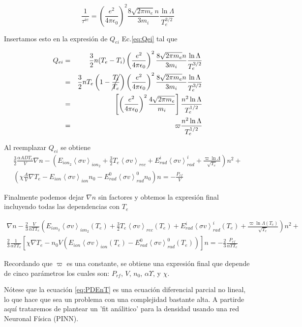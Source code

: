 \documentclass[11pt]{article}
\theoremstyle{definition}
\begin{document}
  \begin{equation*}
    \frac{1}{\tau^{ie}} = \left(\frac{e^2}{4\pi\epsilon_0}\right)^2\frac{8\sqrt{2\pi m_e}n}{3 m_i}\frac{\ln{\Lambda}}{T_e^{3/2}}
  \end{equation*} 

  Insertamos esto en la expresi\'on de $Q_{ei}$ Ec.\eqref{eq:Qei} tal que 

  \begin{eqnarray}
    Q_{ei} &=& \frac{3}{2}n(T_e - T_i) \left(\frac{e^2}{4\pi\epsilon_0}\right)^2\frac{8\sqrt{2\pi m_e}n}{3 m_i}\frac{\ln{\Lambda}}{T_e^{3/2}} \nonumber \\
           &=& \frac{3}{2}nT_e\left(1 - \cancel{\frac{T_i}{T_e}}\right) \left(\frac{e^2}{4\pi\epsilon_0}\right)^2\frac{8\sqrt{2\pi m_e}n}{3 m_i}\frac{\ln{\Lambda}}{T_e^{3/2}} \nonumber \\
           &=& \left[\left(\frac{e^2}{4\pi\epsilon_0}\right)^2\frac{4\sqrt{2\pi m_e}}{m_i}\right]\frac{n^2\ln{\Lambda}}{T_e^{1/2}} \nonumber \\
           &=& \varpi\frac{n^2\ln{\Lambda}}{T_e^{1/2}}
  \end{eqnarray}

  Al reemplazar $Q_{ei}$ se obtiene
  \begin{eqnarray*}
    \frac{3}{2}\frac{\alpha AD T_e}{V}\nabla n - \left(E_{ion_2}\left<\sigma v\right>_{ion_2} + \frac{3}{2}T_e\left<\sigma v\right>_{rec} + E_{rad}^i\left<\sigma v\right>_{rad}^i + \frac{\varpi \ln{\Lambda}}{\sqrt{T_e}}\right)n^2 + \\ \left(\chi\frac{A}{V}\nabla T_e - E_{ion}\left<\sigma v\right>_{ion}n_0 - E_{rad}^0\left<\sigma v\right>_{rad}^0n_0\right)n = - \frac{P_{rf}}{V}
  \end{eqnarray*}

  Finalmente podemos dejar $\nabla n$ sin factores y obtemos la expresi\'on final incluyendo todas las dependencias con $T_e$

  \begin{eqnarray}\label{eq:PDEnT}
    \nabla n - \frac{2}{3}\frac{V}{\alpha \varUpsilon T_e}\left(E_{ion_2}\left<\sigma v\right>_{ion_2}(T_e) + \frac{3}{2}T_e\left<\sigma v\right>_{rec}(T_e) + E_{rad}^i\left<\sigma v\right>_{rad}^i(T_e) + \frac{\varpi\ln{\Lambda}(T_e)}{\sqrt{T_e}}\right)n^2 + \nonumber\\ \frac{2}{3}\frac{1}{\alpha\varUpsilon T_e}\left[\chi\nabla T_e - n_0V\left(E_{ion}\left<\sigma v\right>_{ion}(T_e) - E_{rad}^0\left<\sigma v\right>_{rad}^0(T_e)\right)\right]n = -\frac{2}{3}\frac{P_{rf}}{\alpha \varUpsilon T_e}
  \end{eqnarray}

  Recordando que $\varpi$ es una constante, se obtiene una expresi\'on final que depende de cinco par\'ametros los cuales son: $P_{rf}$, $V$, $n_0$, $\alpha\varUpsilon$, y $\chi$. 

  N\'otese que la ecuaci\'on \eqref{eq:PDEnT} es una ecuaci\'on diferencial parcial no lineal, lo que hace que sea un problema con una complejidad bastante alta. A partirde aqu\'i trataremos de plantear un 'fit an\'alitico' para la densidad usando una red Neuronal F\'isica (PINN). 
  
  
\end{document}
